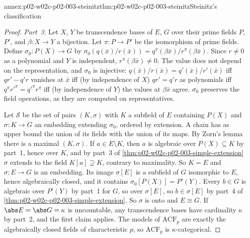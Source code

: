 \begin{annexitem}{annex:p02-w02c-p02-003-steinitz}{thm:p02-w02c-p02-003-steinitz}{Steinitz's classification}
\begin{proof}
\emph{Part~3.}  Let \(X\), \(Y\) be transcendence bases of \(E\), \(G\)
over their prime fields \(P\), \(P'\), and \(\beta\colon X\to Y\) a
bijection.  Let \(\pi\colon P\to P'\) be the isomorphism of prime fields.
Define \(\sigma_0\colon P(X)\to G\) by
\(\sigma_0(q(\bar x)/r(\bar x))=q^\pi(\beta\bar x)/r^\pi(\beta\bar x)\).
Since \(r\neq0\) as a polynomial and \(Y\) is independent,
\(r^\pi(\beta\bar x)\neq0\).  The value does not depend on the
representation, and \(\sigma_0\) is injective: \(q(\bar x)/r(\bar
x)=q'(\bar x)/r'(\bar x)\) iff \(qr'-q'r\) vanishes at \(\bar x\) iff (by
independence of \(X\)) \(qr'=q'r\) as polynomials iff
\(q^\pi r'^\pi=q'^\pi r^\pi\) iff (by independence of \(Y\)) the values at
\(\beta\bar x\) agree.  \(\sigma_0\) preserves the field operations, as
they are computed on representatives.

Let \(\mathcal S\) be the set of pairs \((K,\sigma)\) with \(K\) a subfield
of \(E\) containing \(P(X)\) and \(\sigma\colon K\to G\) an embedding
extending \(\sigma_0\), ordered by extension.  A chain has as upper bound
the union of its fields with the union of its maps.  By Zorn's lemma there
is a maximal \((K,\sigma)\).  If \(a\in E\setminus K\), then \(a\) is
algebraic over \(P(X)\subseteq K\) by part~1, hence over \(K\), and by
part~3 of \cref{thm:p02-w02c-p02-003-simple-extension} \(\sigma\) extends
to the field \(K[a]\supsetneq K\), contrary to maximality.  So \(K=E\) and
\(\sigma\colon E\to G\) is an embedding.  Its image \(\sigma[E]\) is a
subfield of \(G\) isomorphic to \(E\), hence algebraically closed, and it
contains \(\sigma_0[P(X)]=P'(Y)\).  Every \(b\in G\) is algebraic over
\(P'(Y)\) by part~1 for \(G\), so over \(\sigma[E]\), so \(b\in\sigma[E]\)
by part~4 of \cref{thm:p02-w02c-p02-003-simple-extension}.  So \(\sigma\)
is onto and \(E\cong G\).  If \(\abs E=\abs G=\kappa\) is uncountable, any
transcendence bases have cardinality \(\kappa\) by part~2, and the first
claim applies.  The models of \(\mathrm{ACF}_p\) are exactly the
algebraically closed fields of characteristic \(p\), so
\(\mathrm{ACF}_p\) is \(\kappa\)-categorical.
\end{proof}
\end{annexitem}

